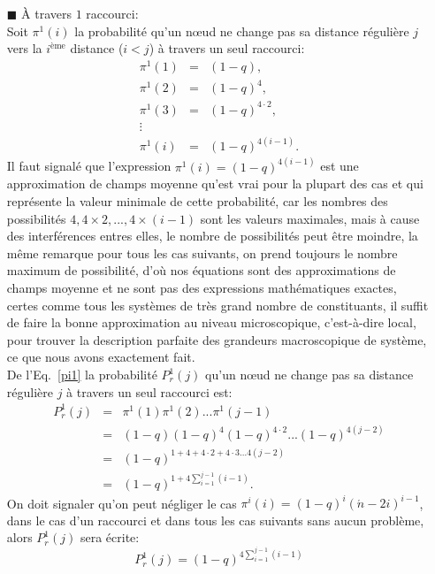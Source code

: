 \begin{itemize}
\item[$\blacksquare$]  \`{A} travers $1$ raccourci:\\
Soit $\pi^1(i)$ la probabilité qu'un nœud ne change pas sa distance régulière $j$ vers
la $i^{\text{ème}}$ distance ($i<j$) à travers un seul raccourci:
\begin{eqnarray}\nonumber
	\pi^1(1)&=&(1-q), \\\nonumber
	\pi^1(2)&=&(1-q)^4,\\\nonumber
	\pi^1(3)&=&(1-q)^{4\cdot2},\\\nonumber
	\vdots\\
	\pi^1(i)&=&(1-q)^{4(i-1)}.
	\label{pi1}
	\end{eqnarray}
	Il faut signalé que l'expression $\pi^1(i)=(1-q)^{4(i-1)}$ est une approximation de champs moyenne qu'est vrai pour la plupart des cas et qui représente la valeur minimale de cette probabilité, car les nombres des possibilités
	$4,4\times2,...,4\times(i-1)$ sont les valeurs maximales, mais à cause des interférences entres elles, le nombre de possibilités peut être moindre, la m\^{e}me remarque pour tous les cas 
	suivants, on prend toujours le nombre maximum de possibilité, d'où nos équations sont des approximations de champs moyenne et ne sont pas des expressions 
	mathématiques exactes, certes comme tous les systèmes de très grand nombre de constituants, il suffit de faire la bonne 
	approximation au niveau microscopique, c'est-à-dire local, pour trouver la description parfaite des grandeurs macroscopique de système, ce que nous
	avons exactement fait.\\
	De l'Eq.~\ref{pi1} la probabilité $P^1_r(j)$ qu'un nœud ne change pas sa distance régulière $j$ à travers un seul raccourci est:
	\begin{eqnarray}\nonumber
	P_r^1(j)&=&\pi^1(1)\pi^1(2)...\pi^1(j-1)\\\nonumber
	&=& (1-q)(1-q)^4(1-q)^{4\cdot2}...(1-q)^{4(j-2)}\\\nonumber
	&=&(1-q)^{1+4+4\cdot2+4\cdot3...4(j-2)}\\\nonumber
	&=&(1-q)^{1+4\sum_{i=1}^{j-1}(i-1)}.
	\end{eqnarray}
	On doit signaler qu'on peut négliger le cas $\pi^i(i)=(1-q)^{i}(\acute{n}-2i)^{i-1}$,  dans le cas d'un raccourci et dans tous les cas suivants sans aucun problème, alors $P_r^1(j)$ sera écrite:
	$$P_r^1(j)=(1-q)^{4\sum_{i=1}^{j-1}(i-1)}$$
	

\end{itemize}
